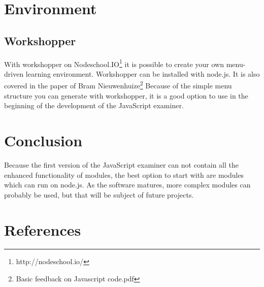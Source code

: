 \documentclass{article}
\begin{document}
\section{Environment}
\subsection{Workshopper}
With workshopper on Nodeschool.IO\footnote{http://nodeschool.io/} it is possible to create your own menu-driven learning environment. 
Workshopper can be installed with node.js.
It is also covered in the paper of Bram Nieuwenhuize\footnote{Basic feedback on Javascript code.pdf}
Because of the simple menu structure you can generate with workshopper, it is a good option to use in the beginning of the development of the JavaScript examiner.

\section{Conclusion}
Because the first version of the JavaScript examiner can not contain all the enhanced functionality of modules, the best option to start with are modules which can run on node.js.
As the software matures, more complex modules can probably be used, but that will be subject of future projects.

\section{References}
\end{document}

